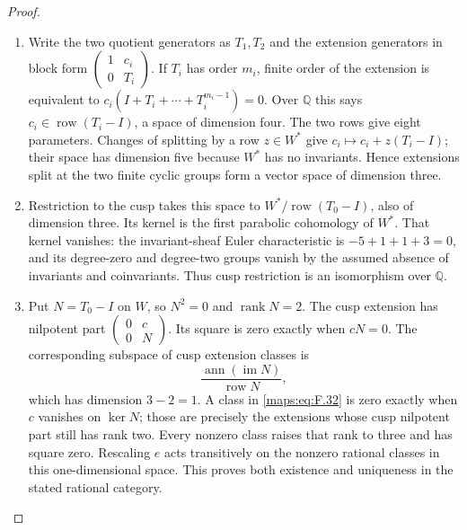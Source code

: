 \documentclass[11pt,a4paper]{article}
\theoremstyle{definition}
\begin{document}
\begin{proof}
\begin{enumerate}[label=\arabic*.]
\item Write the two quotient generators as $T_1,T_2$ and the
extension generators in block form
$\left(\begin{smallmatrix}1&c_i\\0&T_i\end{smallmatrix}\right)$.
If $T_i$ has order $m_i$, finite order of the extension is
equivalent to $c_i(I+T_i+\cdots+T_i^{m_i-1})=0$.
Over $\mathbb Q$ this says $c_i\in\operatorname{row}(T_i-I)$,
a space of dimension four.  The two rows give eight
parameters.  Changes of splitting by a row $z\in W^*$
give $c_i\mapsto c_i+z(T_i-I)$; their space has dimension
five because $W^*$ has no invariants.  Hence extensions
split at the two finite cyclic groups form a vector space
of dimension three.

\item Restriction to the cusp takes this space to
$W^*/\operatorname{row}(T_0-I)$, also of dimension three.
Its kernel is the first parabolic cohomology of $W^*$.
That kernel vanishes: the invariant-sheaf Euler characteristic
is $-5+1+1+3=0$, and its degree-zero and degree-two groups
vanish by the assumed absence of invariants and coinvariants.
Thus cusp restriction is an isomorphism over $\mathbb Q$.

\item Put $N=T_0-I$ on $W$, so $N^2=0$ and $\operatorname{rank}N=2$.
The cusp extension has nilpotent part
$\left(\begin{smallmatrix}0&c\\0&N\end{smallmatrix}\right)$.
Its square is zero exactly when $cN=0$.
The corresponding subspace of cusp extension classes is
\[
 \frac{\operatorname{ann}(\operatorname{im}N)}
      {\operatorname{row}N},
 \tag{F.32}\label{maps:eq:F.32}
\]
which has dimension $3-2=1$.
A class in \eqref{maps:eq:F.32} is zero exactly when $c$ vanishes on
$\ker N$; those are precisely the extensions whose cusp
nilpotent part still has rank two.
Every nonzero class raises that rank to three and has square
zero.  Rescaling $e$ acts transitively on the nonzero rational
classes in this one-dimensional space.  This proves both
existence and uniqueness in the stated rational category.

\end{enumerate}
\end{proof}
\end{document}
